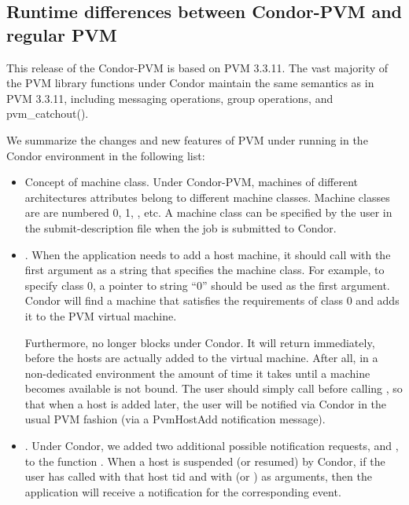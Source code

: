 \subsection{Runtime differences between Condor-PVM and regular PVM}

This release of the Condor-PVM is based on PVM 3.3.11.  The vast majority of the PVM
library functions under Condor maintain the same semantics as in
PVM 3.3.11, including messaging operations, group operations, and 
pvm\_catchout().

We summarize the changes and new features of PVM under running in the
Condor environment in the following list:

\begin{itemize}

\item Concept of machine class.  Under Condor-PVM, machines of
  different architectures attributes belong to different machine classes.  Machine
  classes are are numbered 0, 1, \Dots, etc.  A machine class can be
  specified by the user in the submit-description file when the job
  is submitted to Condor.

\item {}.  When the application
  needs to add a host machine, it should call 
  with the first argument as a string that specifies the machine
  class.  For example, to specify class 0, a pointer to string ``0''
  should be used as the first argument.  Condor will find a machine
  that satisfies the requirements of class 0 and adds it to the PVM
  virtual machine.

  Furthermore,  no longer blocks under Condor.  It
  will return immediately, before the hosts are actually added to the virtual
  machine.  After all, in a non-dedicated environment the amount of time it takes until
  a machine becomes available is not bound. The user should simply call 
   before calling
  , so that when a host is added later, the user
  will be notified via Condor in the usual PVM 
  fashion (via a PvmHostAdd notification message).
    
\item {}.  Under Condor, we added two additional 
  possible notification requests,  and
  , to the function .  When a
  host is suspended (or resumed) by Condor, if the user has called
   with that host tid and with
   (or ) as arguments, then
  the application will receive a notification for the corresponding
  event.


\end{itemize}
